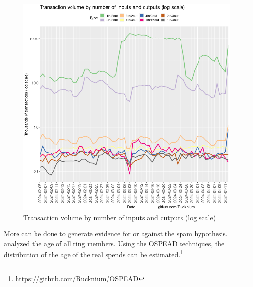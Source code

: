 \documentclass[usletter,11pt,english,openany]{article}
\begin{document}
\begin{figure}[H]
\caption{Transaction volume by number of inputs and outputs (log scale)}
\label{fig-in-out-tx-type-volume}
\centering{}\includegraphics[scale=0.5]{images/in-out-tx-type-volume}
\end{figure}

More can be done to generate evidence for or against the spam hypothesis.
\cite{Krawiec-Thayer2021} analyzed the age of all ring members. Using
the OSPEAD techniques, the distribution of the age of the real spends
can be estimated.\footnote{\url{https://github.com/Rucknium/OSPEAD}} 
\end{document}
